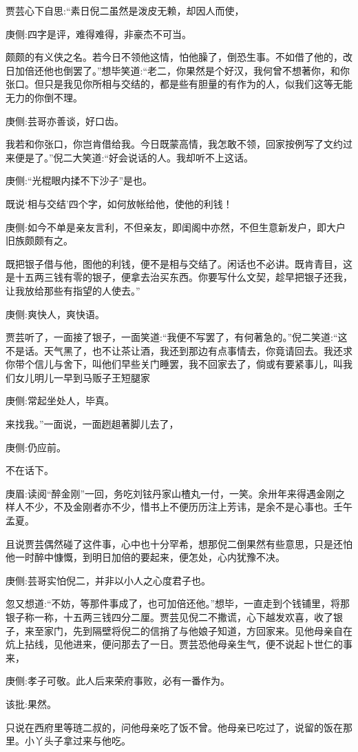 \begin{parag}
    贾芸心下自思:“素日倪二虽然是泼皮无赖，却因人而使，\begin{note}庚侧:四字是评，难得难得，非豪杰不可当。\end{note}颇颇的有义侠之名。若今日不领他这情，怕他臊了，倒恐生事。不如借了他的，改日加倍还他也倒罢了。”想毕笑道:“老二，你果然是个好汉，我何曾不想著你，和你张口。但只是我见你所相与交结的，都是些有胆量的有作为的人，似我们这等无能无力的你倒不理。\begin{note}庚侧:芸哥亦善谈，好口齿。\end{note}我若和你张口，你岂肯借给我。今日既蒙高情，我怎敢不领，回家按例写了文约过来便是了。”倪二大笑道:“好会说话的人。我却听不上这话。\begin{note}庚侧:“光棍眼内揉不下沙子”是也。\end{note}既说‘相与交结’四个字，如何放帐给他，使他的利钱！\begin{note}庚侧:如今不单是亲友言利，不但亲友，即闺阁中亦然，不但生意新发户，即大户旧族颇颇有之。\end{note}既把银子借与他，图他的利钱，便不是相与交结了。闲话也不必讲。既肯青目，这是十五两三钱有零的银子，便拿去治买东西。你要写什么文契，趁早把银子还我，让我放给那些有指望的人使去。”\begin{note}庚侧:爽快人，爽快语。\end{note}贾芸听了，一面接了银子，一面笑道:“我便不写罢了，有何著急的。”倪二笑道:“这不是话。天气黑了，也不让茶让酒，我还到那边有点事情去，你竟请回去。我还求你带个信儿与舍下，叫他们早些关门睡罢，我不回家去了，倘或有要紧事儿，叫我们女儿明儿一早到马贩子王短腿家\begin{note}庚侧:常起坐处人，毕真。\end{note}来找我。”一面说，一面趔趄著脚儿去了，\begin{note}庚侧:仍应前。\end{note}不在话下。\begin{note}庚眉:读阅“醉金刚”一回，务吃刘铉丹家山楂丸一付，一笑。余卅年来得遇金刚之样人不少，不及金刚者亦不少，惜书上不便历历注上芳讳，是余不是心事也。壬午孟夏。\end{note}
\end{parag}


\begin{parag}
    且说贾芸偶然碰了这件事，心中也十分罕希，想那倪二倒果然有些意思，只是还怕他一时醉中慷慨，到明日加倍的要起来，便怎处，心内犹豫不决。\begin{note}庚侧:芸哥实怕倪二，并非以小人之心度君子也。\end{note}忽又想道:“不妨，等那件事成了，也可加倍还他。”想毕，一直走到个钱铺里，将那银子称一称，十五两三钱四分二厘。贾芸见倪二不撒谎，心下越发欢喜，收了银子，来至家门，先到隔壁将倪二的信捎了与他娘子知道，方回家来。见他母亲自在炕上拈线，见他进来，便问那去了一日。贾芸恐他母亲生气，便不说起卜世仁的事来，\begin{note}庚侧:孝子可敬。此人后来荣府事败，必有一番作为。\end{note}\begin{note}该批:果然。\end{note}只说在西府里等琏二叔的，问他母亲吃了饭不曾。他母亲已吃过了，说留的饭在那里。小丫头子拿过来与他吃。
\end{parag}


